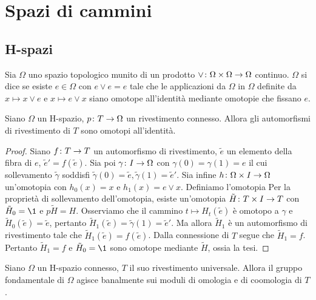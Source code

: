 \chapter{Spazi di cammini}
\label{ch:path-spaces}
\section{H-spazi}
\begin{definition}
Sia $\Omega$ uno spazio topologico munito di un prodotto $\map{\vee}{\Omega\times \Omega}{\Omega}$ continuo. $\Omega$ si dice  se esiste $e\in \Omega$ con $e\vee e=e$ tale che le applicazioni da $\Omega$ in $\Omega$ definite da $x\mapsto x\vee e$ e $x\mapsto e\vee x$ siano omotope all'identità mediante omotopie che fissano $e$.
\end{definition}
\begin{proposition}
Siano $\Omega$ un H-spazio, $\map{p}{T}{\Omega}$ un rivestimento connesso. Allora gli automorfismi di rivestimento di $T$ sono omotopi all'identità.
\end{proposition}
\begin{proof}
Siano $\map{f}{T}{T}$ un automorfismo di rivestimento, $\tilde{e}$ un elemento della fibra di $e$, $\tilde{e}'=f(\tilde{e})$. Sia poi $\map{\gamma}{I}{\Omega}$ con $\gamma(0)=\gamma(1)=e$ il cui sollevamento $\tilde\gamma$ soddisfi $\tilde\gamma(0)=\tilde{e},\tilde\gamma(1)=\tilde{e}'$. Sia infine $\map{h}{\Omega\times I}{\Omega}$ un'omotopia con $h_0(x)=x$ e $h_1(x)=e\vee x$. Definiamo l'omotopia
Per la proprietà di sollevamento dell'omotopia, esiste un'omotopia $\map{\tilde{H}}{T\times I}{T}$ con $\tilde{H}_0=\1$ e $p\tilde{H}=H$. Osserviamo che il cammino $t\mapsto H_t(\tilde{e})$ è omotopo a $\gamma$ e $\tilde{H}_0(\tilde{e})=\tilde{e}$, pertanto $\tilde{H}_1(\tilde{e})=\tilde{\gamma}(1)=\tilde{e}'$. Ma allora $\tilde{H}_1$ è un automorfismo di rivestimento tale che $\tilde{H}_1(\tilde{e})=f(\tilde{e})$. Dalla connessione di $T$ segue che $\tilde{H}_1=f$. Pertanto $\tilde{H}_1=f$ e $\tilde{H}_0=\1$ sono omotope mediante $\tilde H$, ossia la tesi.
\end{proof}
\begin{corollary}
Siano $\Omega$ un H-spazio connesso, $T$ il suo rivestimento universale. Allora il gruppo fondamentale di $\Omega$ agisce banalmente sui moduli di omologia e di coomologia di $T$.
\end{corollary}

